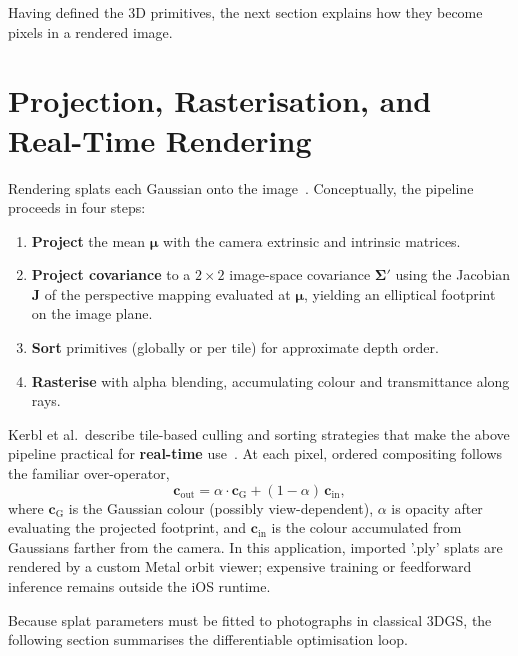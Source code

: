 Having defined the 3D primitives, the next section explains how they become pixels in a
rendered image.


\section{Projection, Rasterisation, and Real-Time Rendering}
\label{sec:3dgs_splatting}

Rendering splats each Gaussian onto the image~\cite{kerbl20233dgs}. Conceptually, the
pipeline proceeds in four steps:

\begin{enumerate}
    \item \textbf{Project} the mean $\boldsymbol{\mu}$ with the camera extrinsic and
    intrinsic matrices.

    \item \textbf{Project covariance} to a $2\times2$ image-space covariance
    $\boldsymbol{\Sigma}'$ using the Jacobian $\mathbf{J}$ of the perspective mapping
    evaluated at $\boldsymbol{\mu}$, yielding an elliptical footprint on the image plane.

    \item \textbf{Sort} primitives (globally or per tile) for approximate depth order.

    \item \textbf{Rasterise} with alpha blending, accumulating colour and transmittance
    along rays.
\end{enumerate}

Kerbl et al.\ describe tile-based culling and sorting strategies that make the above
pipeline practical for \textbf{real-time} use~\cite{kerbl20233dgs}. At each pixel,
ordered compositing follows the familiar over-operator,
\begin{equation}
\mathbf{c}_{\mathrm{out}} = \alpha \cdot \mathbf{c}_{\mathrm{G}}
+ (1-\alpha)\,\mathbf{c}_{\mathrm{in}},
\label{eq:3dgs_alpha_blend}
\end{equation}
where $\mathbf{c}_{\mathrm{G}}$ is the Gaussian colour (possibly view-dependent),
$\alpha$ is opacity after evaluating the projected footprint, and
$\mathbf{c}_{\mathrm{in}}$ is the colour accumulated from Gaussians farther from the
camera. In this application, imported '.ply' splats are rendered by a custom
Metal orbit viewer; expensive training or feedforward inference remains outside the
iOS runtime.

Because splat parameters must be fitted to photographs in classical 3DGS, the
following section summarises the differentiable optimisation loop.


